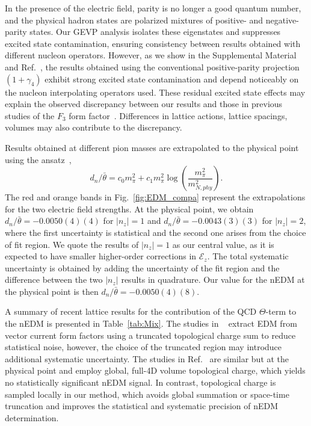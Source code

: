 \documentclass[aps,prl,twocolumn,superscriptaddress,nofootinbib]{revtex4-2}
\newcommand{\mcE}{{\mathcal E}}
\begin{document}
In the presence of the electric field, parity is no longer a good quantum number, and  
the physical hadron states are polarized mixtures of positive- and negative-parity states. 
Our GEVP analysis isolates these eigenstates and suppresses excited state contamination, 
ensuring consistency between results obtained with different nucleon operators. 
However, as we show in the Supplemental Material~\cite{supp} and Ref.~\cite{Blum:2026hul}, the results obtained using the conventional positive-parity projection $(1+\gamma_4)$  exhibit strong excited state contamination and depend noticeably on the nucleon interpolating operators used.
These residual excited state effects may explain the observed discrepancy between our results and those in previous studies of the $F_3$ form factor~\cite{Dragos:2019oxn,Liang:2023jfj}. Differences in lattice actions, lattice spacings, volumes may also contribute to the discrepancy.


Results obtained at different pion masses are extrapolated to the physical point using the ansatz~\cite{Crewther:1979pi, OConnell:2005mfp},
\begin{equation}
d_n/\bar\theta=c_0 m_\pi^2+c_1m_\pi^2\log\left(\frac{m_\pi^2}{m^{2}_{N,phy}}\right).
\end{equation}
The red and orange bands in Fig.~\ref{fig:EDM_compa} represent the extrapolations for the two electric field strengths. 
At the physical point, we obtain $d_n/\bar\theta=-0.0050(4)(4)$ for $|n_z|=1$ and $d_n/\bar\theta=-0.0043(3)(3)$ for $|n_z|=2$, where the first uncertainty is statistical and the second one arises from the choice of fit region. 
We quote the results of $|n_z|=1$ as our central value, as it is expected to have smaller higher-order corrections in $\mcE_z$.  The total systematic uncertainty is obtained by adding the uncertainty of the fit region and the difference between the two $|n_z|$ results in quadrature.
Our value for the nEDM at the physical point is then $d_n/\bar\theta=-0.0050(4)(8)$.


A summary of recent lattice results for the contribution of the QCD $\Theta$-term to the nEDM is presented in Table~\ref{tab:Mix}. 
The studies in ~\cite{Dragos:2019oxn,Liang:2023jfj} extract EDM from vector current form factors using a truncated topological charge sum to reduce statistical noise, however, the choice of the truncated region may introduce additional systematic uncertainty. 
The studies in Ref.~\cite{Alexandrou:2020mds,Bhattacharya:2021lol} are similar but at the physical point and employ global, full-4D volume topological charge, which yields no statistically significant nEDM signal.
In contrast, topological charge is sampled locally in our method, which avoids  global summation or space-time truncation and improves the statistical and systematic precision of nEDM determination.
\end{document}
